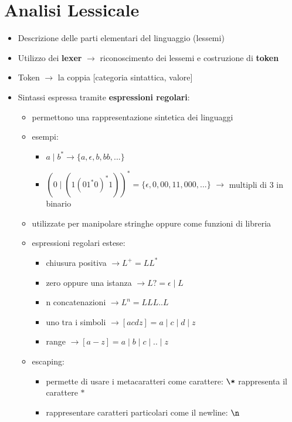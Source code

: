 \documentclass{article}
\begin{document}
\newpage

\section*{Analisi Lessicale}

\begin{itemize}
  \item Descrizione delle parti elementari del linguaggio (lessemi)
  \item Utilizzo dei \textbf{lexer} $\rightarrow$ riconoscimento dei lessemi e costruzione di \textbf{token}
  \item Token $\rightarrow$ la coppia [categoria sintattica, valore]
  \item Sintassi espressa tramite \textbf{espressioni regolari}:
  \begin{itemize}
    \item permettono una rappresentazione sintetica dei linguaggi
    \item esempi: 
    \begin{itemize}
      \item $a \mid b^* \rightarrow \{a, \epsilon, b, bb, ... \}$ 
      \item $(0 \mid (1(01^*0)^*1))^* = \{ \epsilon, 0, 00, 11, 000, ...\}$ $\rightarrow$ multipli di 3 in binario
    \end{itemize}
    \item utilizzate per manipolare stringhe oppure come funzioni di libreria
    \item espressioni regolari estese:
    \begin{itemize}
      \item chiusura positiva $\rightarrow  L^+ = LL^*$
      \item zero oppure una istanza $\rightarrow  L? = \epsilon \mid L$
      \item n concatenazioni $\rightarrow L^n = LLL..L$
      \item uno tra i simboli $\rightarrow [acdz] = a \mid c \mid d \mid z$
      \item range $\rightarrow [a-z] =  a \mid b \mid c \mid .. \mid z$
    \end{itemize}
    \item escaping:
    \begin{itemize}
      \item permette di usare i metacaratteri come carattere: $ \verb|\*|$ rappresenta il carattere $\ast$
      \item rappresentare caratteri particolari come il newline: $\verb|\n|$

\end{itemize}
\end{itemize}
\end{itemize}
\end{document}
